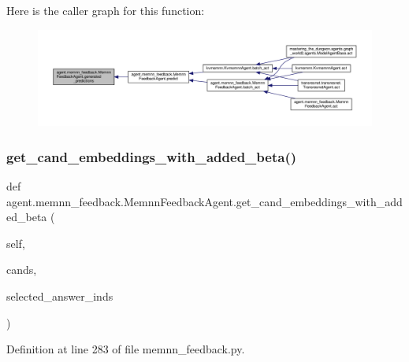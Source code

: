 Here is the caller graph for this function\+:
\nopagebreak
\begin{figure}[H]
\begin{center}
\leavevmode
\includegraphics[width=350pt]{classagent_1_1memnn__feedback_1_1MemnnFeedbackAgent_a959cbfdba3d83ba7e8571ef999c57601_icgraph}
\end{center}
\end{figure}
\mbox{\label{classagent_1_1memnn__feedback_1_1MemnnFeedbackAgent_a4f0769934f608795f6d0bd6fa5d19a17}} 
\subsubsection{\texorpdfstring{get\+\_\+cand\+\_\+embeddings\+\_\+with\+\_\+added\+\_\+beta()}{get\_cand\_embeddings\_with\_added\_beta()}}
{\footnotesize\ttfamily def agent.\+memnn\+\_\+feedback.\+Memnn\+Feedback\+Agent.\+get\+\_\+cand\+\_\+embeddings\+\_\+with\+\_\+added\+\_\+beta (\begin{DoxyParamCaption}\item[{}]{self,  }\item[{}]{cands,  }\item[{}]{selected\+\_\+answer\+\_\+inds }\end{DoxyParamCaption})}



Definition at line 283 of file memnn\+\_\+feedback.\+py.



